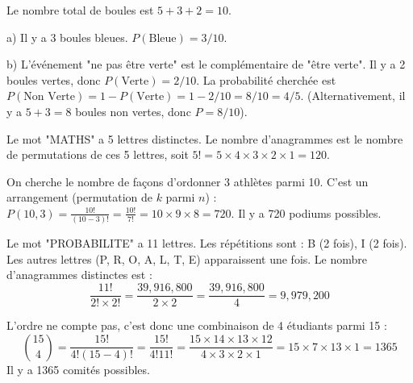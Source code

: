 \begin{correctionbox}
Le nombre total de boules est $5+3+2 = 10$.

a) Il y a 3 boules bleues. $P(\text{Bleue}) = 3/10$.

b) L'événement "ne pas être verte" est le complémentaire de "être verte". Il y a 2 boules vertes, donc $P(\text{Verte}) = 2/10$. La probabilité cherchée est $P(\text{Non Verte}) = 1 - P(\text{Verte}) = 1 - 2/10 = 8/10 = 4/5$. (Alternativement, il y a $5+3=8$ boules non vertes, donc $P=8/10$).
\end{correctionbox}


\begin{correctionbox}
Le mot "MATHS" a 5 lettres distinctes. Le nombre d'anagrammes est le nombre de permutations de ces 5 lettres, soit $5! = 5 \times 4 \times 3 \times 2 \times 1 = 120$.
\end{correctionbox}

\begin{correctionbox}
On cherche le nombre de façons d'ordonner 3 athlètes parmi 10. C'est un arrangement (permutation de $k$ parmi $n$) :
$P(10, 3) = \frac{10!}{(10-3)!} = \frac{10!}{7!} = 10 \times 9 \times 8 = 720$.
Il y a 720 podiums possibles.
\end{correctionbox}

\begin{correctionbox}
Le mot "PROBABILITE" a 11 lettres. Les répétitions sont : B (2 fois), I (2 fois). Les autres lettres (P, R, O, A, L, T, E) apparaissent une fois.
Le nombre d'anagrammes distinctes est :
$$ \frac{11!}{2! \times 2!} = \frac{39,916,800}{2 \times 2} = \frac{39,916,800}{4} = 9,979,200 $$
\end{correctionbox}


\begin{correctionbox}
L'ordre ne compte pas, c'est donc une combinaison de 4 étudiants parmi 15 :
$$ \binom{15}{4} = \frac{15!}{4!(15-4)!} = \frac{15!}{4!11!} = \frac{15 \times 14 \times 13 \times 12}{4 \times 3 \times 2 \times 1} = 15 \times 7 \times 13 \times 1 = 1365 $$
Il y a 1365 comités possibles.
\end{correctionbox}

